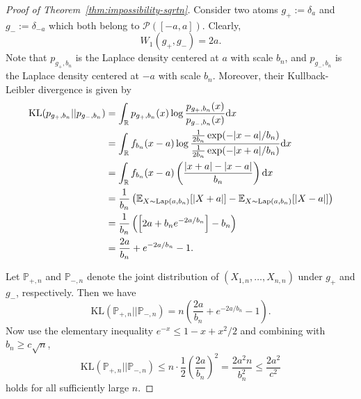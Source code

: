 \documentclass[english, 11pt]{article}
\theoremstyle{plain}
\theoremstyle{definition}
\theoremstyle{remark}
\begin{document}
\begin{appendix}
\begin{proof}[Proof of Theorem~\ref{thm:impossibility-sqrtn}]
Consider two atoms $g_+ := \delta_a$ and $g_- := \delta_{-a}$ which both belong to $\mathcal P([-a,a])$. Clearly,
\begin{equation}\label{eq:w1-two-point-distance}
W_1(g_+,g_-)=2a.
\end{equation}
Note that $p_{g_+, b_n}$ is the Laplace density centered at $a$ with scale $b_n$, and $p_{g_-, b_n}$ is the Laplace density centered at $-a$ with scale $b_n$. Moreover, their Kullback-Leibler divergence is given by
\begin{align}
\mathrm{KL}(p_{g_+, b_n} || p_{g_-, b_n})
& = \int_{\mathbb R} p_{g_+, b_n}(x) \log \frac{p_{g_+, b_n}(x)}{p_{g_-, b_n}(x)} \mathrm{d} x \notag \\
& = \int_{\mathbb R} f_{b_n}(x-a) \log \frac{\frac{1}{2b_n} \exp(-|x-a|/b_n)}{\frac{1}{2b_n} \exp(-|x+a|/b_n)} \mathrm{d} x \notag \\
& = \int_{\mathbb R} f_{b_n}(x-a) \left( \frac{|x+a| - |x-a|}{b_n} \right) \mathrm{d} x \notag \\
& = \frac{1}{b_n} \left( \mathbb{E}_{X \sim \text{Lap}(a, b_n)} [|X+a|] - \mathbb{E}_{X \sim \text{Lap}(a, b_n)} [|X-a|] \right) \notag \\
& = \frac{1}{b_n} \left( \left[ 2a + b_n e^{-2a/b_n} \right] - b_n \right) \notag \\
& = \frac{2a}{b_n} + e^{-2a/b_n} - 1.
\end{align}

Let $\mathbb P_{+,n}$ and $\mathbb P_{-,n}$ denote the joint distribution of
$(X_{1,n},\dots,X_{n,n})$ under $g_+$ and $g_-$, respectively. Then we have
\begin{equation*}
\mathrm{KL}(\mathbb P_{+,n} || \mathbb P_{-,n}) = n\left(\frac{2a}{b_n}+e^{-2a/b_n} -1\right).
\end{equation*}
Now use the elementary inequality $e^{-x}\le 1-x+{x^2}/{2}$ and combining with $b_n\ge c\sqrt n$,
\begin{equation}\label{eq:kl-upperbound}
\mathrm{KL}(\mathbb P_{+,n} || \mathbb P_{-,n}) \le n\cdot \frac12\left(\frac{2a}{b_n}\right)^2 = \frac{2a^2n}{b_n^2} \le \frac{2a^2}{c^2}
\end{equation}
holds for all sufficiently large $n$.


\end{proof}
\end{appendix}
\end{document}
